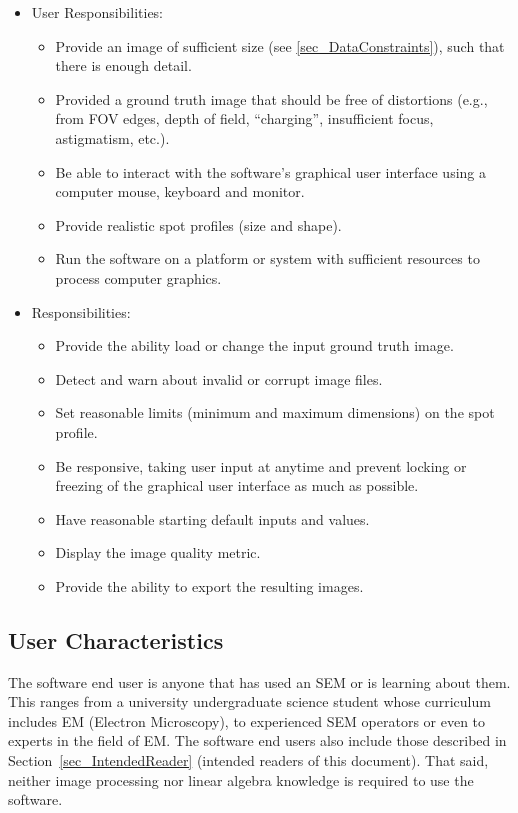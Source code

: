 \documentclass[12pt]{article}
\begin{document}
\begin{itemize}

  \item User Responsibilities:
  \begin{itemize}
    \item Provide an image of sufficient size (see \ref{sec_DataConstraints}), such that there is enough detail.
    \item Provided a ground truth image that should be free of distortions (e.g., from FOV edges, depth of field, ``charging'', insufficient focus, astigmatism, etc.).
    \item Be able to interact with the software's graphical user interface using a computer mouse, keyboard and monitor.
    \item Provide realistic spot profiles (size and shape).
    \item Run the software on a platform or system with sufficient resources to process computer graphics.
  \end{itemize}

  \item \progname{} Responsibilities:
  \begin{itemize}
    \item Provide the ability load or change the input ground truth image.
    \item Detect and warn about invalid or corrupt image files.
    \item Set reasonable limits (minimum and maximum dimensions) on the spot profile. 
    \item Be responsive, taking user input at anytime and prevent locking or freezing of the graphical user interface as much as possible.
    \item Have reasonable starting default inputs and values.
    \item Display the image quality metric.
    \item Provide the ability to export the resulting images.
  \end{itemize}

\end{itemize}

\subsection{User Characteristics} \label{SecUserCharacteristics}

The \progname{} software end user is anyone that has used an SEM or is learning about them. 
This ranges from a university undergraduate science student whose curriculum includes 
EM (Electron Microscopy), to experienced SEM operators or even to experts in the field of EM. 
The software end users also include those described in Section~\ref{sec_IntendedReader} 
(intended readers of this document). That said, neither image processing nor linear algebra knowledge 
is required to use the software. 
\end{document}
